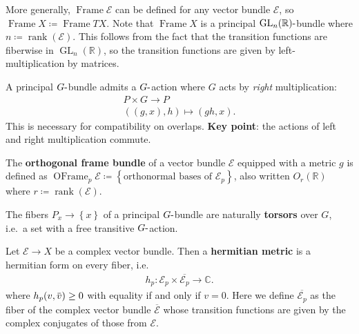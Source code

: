 \begin{remark}

More generally, \({\operatorname{Frame}}\mathcal{E}\) can be defined for
any vector bundle \(\mathcal{E}\), so
\({\operatorname{Frame}}X \coloneqq{\operatorname{Frame}}TX\). Note that
\({\operatorname{Frame}}X\) is a principal
\(\operatorname{GL}_n({\mathbb{R}}){\hbox{-}}\)bundle where
\(n\coloneqq\operatorname{rank}(\mathcal{E})\). This follows from the
fact that the transition functions are fiberwise in
\(\operatorname{GL}_n({\mathbb{R}})\), so the transition functions are
given by left-multiplication by matrices.

\end{remark}

\begin{remark}[Important]

A principal \(G{\hbox{-}}\)bundle admits a \(G{\hbox{-}}\)action where
\(G\) acts by \emph{right} multiplication:
\begin{align*}
P \times G \to P \\
( (g, x), h) \mapsto (gh, x)
.\end{align*}
This is necessary for compatibility on overlaps. \textbf{Key point}: the
actions of left and right multiplication commute.

\end{remark}

\begin{definition}

The \textbf{orthogonal frame bundle} of a vector bundle \(\mathcal{E}\)
equipped with a metric \(g\) is defined as
\({\operatorname{OFrame}}_p \mathcal{E}\coloneqq\left\{{\text{orthonormal bases of } \mathcal{E}_p}\right\}\),
also written \(O_r({\mathbb{R}})\) where
\(r \coloneqq\operatorname{rank}( \mathcal{E})\).

\end{definition}

\begin{remark}

The fibers \(P_x \to \left\{{x}\right\}\) of a principal
\(G{\hbox{-}}\)bundle are naturally \textbf{torsors} over \(G\), i.e.~a
set with a free transitive \(G{\hbox{-}}\)action.

\end{remark}

\begin{definition}[?]

Let \(\mathcal{E}\to X\) be a complex vector bundle. Then a
\textbf{hermitian metric} is a hermitian form on every fiber, i.e.~
\begin{align*}
h_p: \mathcal{E}_p \times\overline{\mathcal{E}_p } \to {\mathbb{C}}
.\end{align*}
where
\(h_p(v, \mkern 1.5mu\overline{\mkern-1.5muv\mkern-1.5mu}\mkern 1.5mu ) \geq 0\)
with equality if and only if \(v=0\). Here we define
\(\overline{\mathcal{E}_p}\) as the fiber of the complex vector bundle
\(\overline{\mathcal{E}}\) whose transition functions are given by the
complex conjugates of those from \(\mathcal{E}\).

\end{definition}

